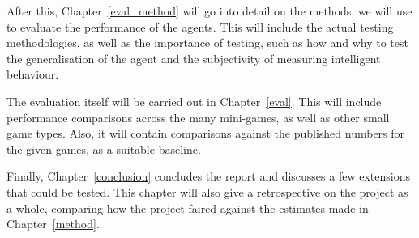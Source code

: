 After this, Chapter~\ref{eval_method} will go into detail on the methods, we will
use to evaluate the performance of the agents. This will include the actual
testing methodologies, as well as the importance of testing, such as how and why
to test the generalisation of the agent and the subjectivity of measuring
intelligent behaviour.

The evaluation itself will be carried out in Chapter~\ref{eval}.  This will
include performance comparisons across the many mini-games, as well as other
small game types.  Also, it will contain comparisons against the published
numbers for the given games, as a suitable baseline.

Finally, Chapter~\ref{conclusion} concludes the report and discusses a few
extensions that could be tested. This chapter will also give a retrospective on
the project as a whole, comparing how the project faired against the estimates
made in Chapter~\ref{method}.
